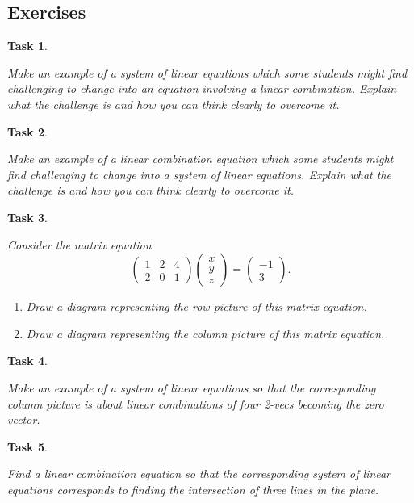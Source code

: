 \documentclass[10pt,]{book}
\theoremstyle{plain}
\numberwithin{equation}{section}
\newtheorem{task}{Task}[chapter]
\begin{document}
\subsection[Exercises]{Exercises}\label{subsection-23}
\begin{task}
\label{task-31}

        Make an example of a system of linear equations which some students might
        find challenging to change into an equation involving a linear combination.
        Explain what the challenge is and how you can think clearly to overcome it.
      \end{task}
\begin{task}
\label{task-32}

        Make an example of a linear combination equation which some students might
        find challenging to change into a system of linear equations. Explain
        what the challenge is and how you can think clearly to overcome it.
      \end{task}
\begin{task}
\label{task-33}

        Consider the matrix equation\[
        \begin{pmatrix}1 & 2 & 4 \\ 2 & 0 & 1 \end{pmatrix}
          \begin{pmatrix} x \\ y \\ z \end{pmatrix} = \begin{pmatrix} -1 \\ 3
          \end{pmatrix}.
        \]\begin{enumerate}
\item{}
            Draw a diagram representing the row picture of this matrix equation.
          \item{}
            Draw a diagram representing the column picture of this matrix equation.
          \end{enumerate}
\end{task}
\begin{task}
\label{task-34}

        Make an example of a system of linear equations so that the
        corresponding column picture is about linear combinations of four 2-vecs
        becoming the zero vector.
      \end{task}
\begin{task}
\label{task-35}

        Find a linear combination equation so that the corresponding system of
        linear equations corresponds to finding the intersection of three lines
        in the plane.
      \end{task}
\end{document}
